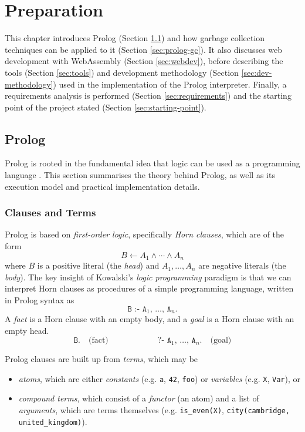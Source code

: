 \chapter{Preparation}

This chapter introduces Prolog (Section \ref{sec:prolog}) and how garbage collection techniques can be applied to it (Section \ref{sec:prolog-gc}). It also discusses web development with WebAssembly (Section \ref{sec:webdev}), before describing the tools (Section \ref{sec:tools}) and development methodology (Section \ref{sec:dev-methodology}) used in the implementation of the Prolog interpreter. Finally, a requirements analysis is performed (Section \ref{sec:requirements}) and the starting point of the project stated (Section \ref{sec:starting-point}).

\section{Prolog}

\label{sec:prolog}

Prolog is rooted in the fundamental idea that logic can be used as a programming language \cite{kowalskiPredicateLogicProgramming1974}. This section summarises the theory behind Prolog, as well as its execution model and practical implementation details.

\subsection{Clauses and Terms}

Prolog is based on \emph{first-order logic}, specifically \emph{Horn clauses}, which are of the form
$$
B \leftarrow A_1 \land \cdots \land A_n
$$
where $B$ is a positive literal (the \emph{head}) and $A_1, \ldots, A_n$ are negative literals (the \emph{body}). The key insight of Kowalski's \emph{logic programming} paradigm is that we can interpret Horn clauses as procedures of a simple programming language, written in Prolog syntax as
$$
\texttt{B :- A$_1$, $\ldots$, A$_n$.}
$$
A \emph{fact} is a Horn clause with an empty body, and a \emph{goal} is a Horn clause with an empty head.
$$
\texttt{B.} \quad \text{(fact)} \qquad\qquad\qquad \texttt{?- A$_1$, $\ldots$, A$_n$.} \quad \text{(goal)}
$$

Prolog clauses are built up from \emph{terms}, which may be
\begin{itemize}
\item \emph{atoms}, which are either \emph{constants} (e.g. \texttt{a}, \texttt{42}, \texttt{foo}) or \emph{variables} (e.g. \texttt{X}, \texttt{Var}), or
\item \emph{compound terms}, which consist of a \emph{functor} (an atom) and a list of \emph{arguments}, which are terms themselves (e.g. \texttt{is\_even(X)}, \texttt{city(cambridge, united\_kingdom)}).
\end{itemize}

